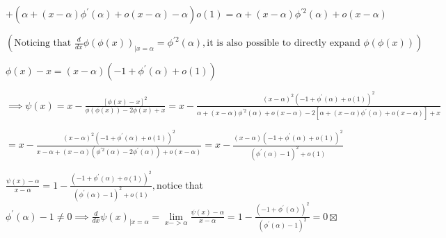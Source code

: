 \documentclass{article}
\begin{document}
$+\left( \alpha +\left( x-\alpha \right) \phi ^{\prime }\left( \alpha
\right) +o(x-\alpha )-\alpha \right) o\left( 1\right) =\alpha +\left(
x-\alpha \right) \phi ^{\prime 2}\left( \alpha \right) +o(x-\alpha )$

$\left( \text{Noticing that }\frac{d}{dx}\phi \left( \phi \left( x\right)
\right) _{|x=\alpha }=\phi ^{\prime 2}\left( \alpha \right) ,\text{it is
also possible to directly expand }\phi \left( \phi \left( x\right) \right)
\right) $

$\phi \left( x\right) -x=\left( x-\alpha \right) \left( -1+\phi ^{\prime
}\left( \alpha \right) +o\left( 1\right) \right) $

$\implies \psi \left( x\right) =x-\frac{\left[ \phi \left( x\right) -x\right]
^{2}}{\phi \left( \phi \left( x\right) \right) -2\phi \left( x\right) +x}=x-%
\frac{\left( x-\alpha \right) ^{2}\left( -1+\phi ^{\prime }\left( \alpha
\right) +o\left( 1\right) \right) ^{2}}{\alpha +\left( x-\alpha \right) \phi
^{\prime 2}\left( \alpha \right) +o(x-\alpha )-2\left[ \alpha +\left(
x-\alpha \right) \phi ^{\prime }\left( \alpha \right) +o(x-\alpha )\right] +x%
}$

$=x-\frac{\left( x-\alpha \right) ^{2}\left( -1+\phi ^{\prime }\left( \alpha
\right) +o\left( 1\right) \right) ^{2}}{x-\alpha +\left( x-\alpha \right)
(\phi ^{\prime 2}\left( \alpha \right) -2\phi ^{\prime }\left( \alpha
\right) )+o(x-\alpha )}=x-\frac{\left( x-\alpha \right) \left( -1+\phi
^{\prime }\left( \alpha \right) +o\left( 1\right) \right) ^{2}}{\left( \phi
^{\prime }\left( \alpha \right) -1\right) ^{2}+o(1)}$

$\frac{\psi \left( x\right) -\alpha }{x-\alpha }=1-\frac{\left( -1+\phi
^{\prime }\left( \alpha \right) +o\left( 1\right) \right) ^{2}}{\left( \phi
^{\prime }\left( \alpha \right) -1\right) ^{2}+o(1)},$notice that $\phi
^{\prime }\left( \alpha \right) -1\neq 0\implies \frac{d}{dx}\psi \left(
x\right) _{|x=\alpha }=\underset{x->\alpha }{\lim }\frac{\psi \left(
x\right) -\alpha }{x-\alpha }=1-\frac{\left( -1+\phi ^{\prime }\left( \alpha
\right) \right) ^{2}}{\left( \phi ^{\prime }\left( \alpha \right) -1\right)
^{2}}=0\boxtimes $

\end{document}
